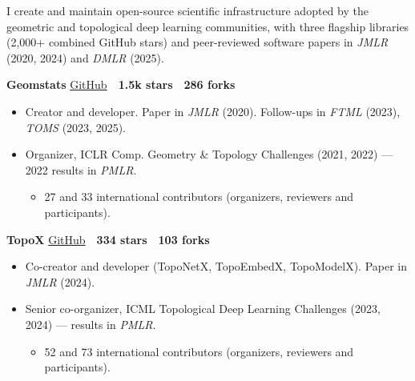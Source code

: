 \noindent I create and maintain open-source scientific infrastructure adopted by the geometric and topological deep learning communities, with three flagship libraries (2,000+ combined GitHub stars) and peer-reviewed software papers in \textit{JMLR} (2020, 2024) and \textit{DMLR} (2025).

\smallskip

\noindent\textbf{Geomstats} \hfill {\small \href{https://github.com/geomstats/geomstats}{GitHub} \,\textperiodcentered\, \textbf{1.5k stars} \,\textperiodcentered\, \textbf{286 forks}}
\begin{itemize}[leftmargin=*,itemsep=0.1em,topsep=0.15em,parsep=0pt,partopsep=0pt]
    \item Creator and developer. Paper in \textit{JMLR} (2020). Follow-ups in \textit{FTML} (2023), \textit{TOMS} (2023, 2025).
    \item Organizer, ICLR Comp. Geometry \& Topology Challenges (2021, 2022) --- 2022 results in \textit{PMLR}.
    \begin{itemize}[leftmargin=*,itemsep=0.1em,topsep=0.15em,parsep=0pt,partopsep=0pt]
        \item 27 and 33 international contributors (organizers, reviewers and participants).
    \end{itemize}
\end{itemize}

\smallskip

\noindent\textbf{TopoX} \hfill {\small \href{https://pyt-team.github.io/}{GitHub} \,\textperiodcentered\, \textbf{334 stars} \,\textperiodcentered\, \textbf{103 forks}}
\begin{itemize}[leftmargin=*,itemsep=0.1em,topsep=0.15em,parsep=0pt,partopsep=0pt]
    \item Co-creator and developer (TopoNetX, TopoEmbedX, TopoModelX). Paper in \textit{JMLR} (2024).
    \item Senior co-organizer, ICML Topological Deep Learning Challenges (2023, 2024) --- results in \textit{PMLR}.
    \begin{itemize}[leftmargin=*,itemsep=0.1em,topsep=0.15em,parsep=0pt,partopsep=0pt]
        \item 52 and 73 international contributors (organizers, reviewers and participants).
    \end{itemize}
\end{itemize}

\smallskip

